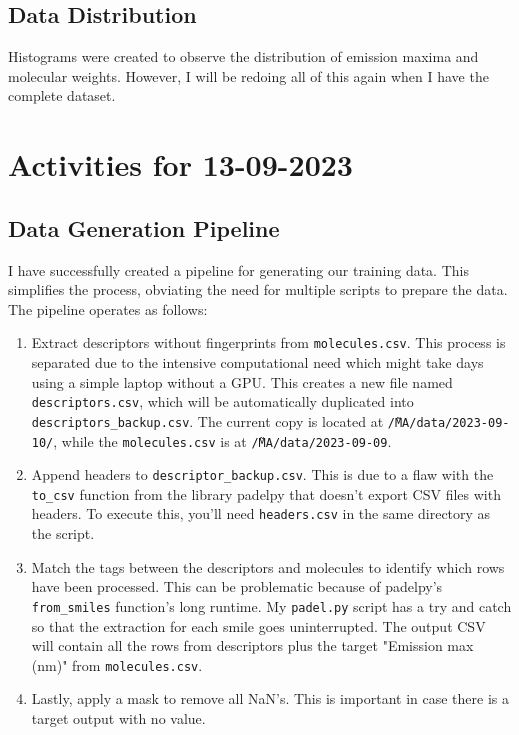 \documentclass{article}
\begin{document}
\subsection*{Data Distribution}
Histograms were created to observe the distribution of emission maxima and molecular weights. However, I will be redoing all of this again when I have the complete dataset.

\section*{Activities for 13-09-2023}
\subsection*{Data Generation Pipeline}
I have successfully created a pipeline for generating our training data. This simplifies the process, obviating the need for multiple scripts to prepare the data. The pipeline operates as follows:

\begin{enumerate}
    \item Extract descriptors without fingerprints from \texttt{molecules.csv}. This process is separated due to the intensive computational need which might take days using a simple laptop without a GPU. This creates a new file named \texttt{descriptors.csv}, which will be automatically duplicated into \texttt{descriptors\_backup.csv}. The current copy is located at \texttt{\~/MA/data/2023-09-10/}, while the \texttt{molecules.csv} is at \texttt{\~/MA/data/2023-09-09}.
    
    \item Append headers to \texttt{descriptor\_backup.csv}. This is due to a flaw with the \texttt{to\_csv} function from the library padelpy that doesn't export CSV files with headers. To execute this, you'll need \texttt{headers.csv} in the same directory as the script.
    
    \item Match the tags between the descriptors and molecules to identify which rows have been processed. This can be problematic because of padelpy's \texttt{from\_smiles} function's long runtime. My \texttt{padel.py} script has a try and catch so that the extraction for each smile goes uninterrupted. The output CSV will contain all the rows from descriptors plus the target "Emission max (nm)" from \texttt{molecules.csv}.
    
    \item Lastly, apply a mask to remove all NaN's. This is important in case there is a target output with no value. 
\end{enumerate}
\end{document}
